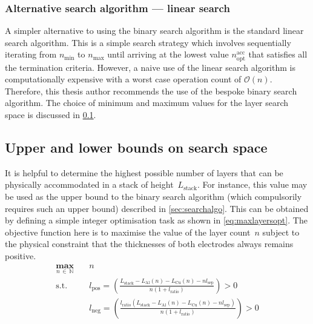 \subsubsection*{Alternative search algorithm --- linear search}

A  simpler alternative  to using  the binary  search algorithm  is the  standard
linear  search  algorithm. This  is  a  simple  search strategy  which  involves
sequentially iterating  from $n_\text{min}$ to $n_\text{max}$  until arriving at
the lowest  value $n_\text{opt}^\text{acc}$  that satisfies all  the termination
criteria. However, a naive use of the linear search algorithm is computationally
expensive with a worst case operation count of $\mathcal{O}(n)$. Therefore, this
thesis author  recommends the use  of the  bespoke binary search  algorithm. The
choice of minimum and maximum values for  the layer search space is discussed in
\cref{sec:layersearchbounds}.

\subsection{Upper and lower bounds on search space}\label{sec:layersearchbounds}


It is  helpful to determine  the highest possible number  of layers that  can be
physically  accommodated in  a stack  of height~$L_\text{stack}$.  For instance,
this value may be used as the  upper bound to the binary search algorithm (which
compulsorily requires  such an upper bound)  described in \cref{sec:searchalgo}.
This can be obtained by defining a  simple integer optimisation task as shown in
\cref{eq:maxlayersopt}. The objective function here  is to maximise the value of
the layer count~$n$  subject to the physical constraint that  the thicknesses of
both electrodes always remains positive.
\begin{equation}\label{eq:maxlayersopt}
    \begin{aligned}
        \underset{n \, \in \, \mathbb{N}}{\mathbf{max}} \quad & n                                                                                                                                              \\
        \text{s.t.} \quad                                     & l_\text{pos} = \left(\frac{L_\text{stack} - L_\text{Al}(n) - L_\text{Cu}(n) - n l_\text{sep}}{n(1 + l_\text{ratio})}\right) > 0 \\
                                                              & l_\text{neg} = \left(\frac{l_\text{ratio}(L_\text{stack} - L_\text{Al}(n) - L_\text{Cu}(n) - n
l_\text{sep})}{n(1 + l_\text{ratio})}\right) > 0
\end{aligned}
\end{equation}


